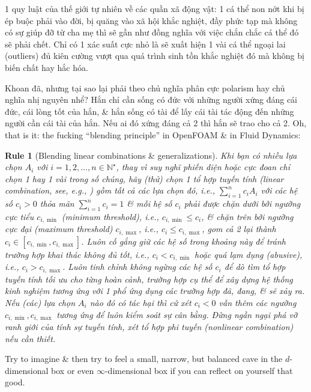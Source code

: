 \documentclass[12pt,twoside]{book}
\newtheorem{Rule}{Rule}
\begin{document}
1 quy luật của thế giới tự nhiên về các quần xã động vật: 1 cá thể non nớt khi bị ép buộc phải vào đời, bị quăng vào xã hội khắc nghiệt, đầy phức tạp mà không có sự giúp đỡ từ cha mẹ thì sẽ gần như đồng nghĩa với việc chắn chắc cá thể đó sẽ phải chết. Chỉ có 1 xác suất cực nhỏ là sẽ xuất hiện 1 vài cá thể ngoại lai (outliers) đủ kiên cường vượt qua quá trình sinh tồn khắc nghiệt đó mà không bị biến chất hay hắc hóa.

Khoan đã, nhưng tại sao lại phải theo chủ nghĩa phân cực polarism hay chủ nghĩa nhị nguyên nhể? Hắn chỉ cần sống có đức với những người xứng đáng cái đức, cái lòng tốt của hắn, \& hắn sống có tài để lấy cái tài tác động đến những người cần cái tài của hắn. Nếu ai đó xứng đáng cả 2 thì hắn sẽ trao cho cả 2. Oh, that is it: the fucking ``blending principle'' in OpenFOAM \& in Fluid Dynamics:

\begin{Rule}[Blending linear combinations \& generalizations]
	Khi bạn có nhiều lựa chọn $A_i$ với $i = 1,2,\ldots,n\in\mathbb{N}^\star$, thay vì suy nghĩ phiến diện hoặc cực đoan chỉ chọn 1 hay 1 vài trong số chúng, hãy (thử) chọn 1 tổ hợp tuyến tính (linear combination, see, e.g., {\rm\cite{Hung_linear_algebra,Trefethen_Bau1997,Trefethen_Bau2022}}) gồm tất cả các lựa chọn đó, i.e., $\sum_{i = 1}^n c_iA_i$ với các hệ số $c_i > 0$ thỏa mãn $\sum_{i = 1}^n c_i = 1$ \& mỗi hệ số $c_i$ phải được chặn dưới bởi ngưỡng cực tiểu $c_{i,\min}$ (minimum threshold), i.e., $c_{i,\min}\le c_i$, \& chặn trên bởi ngưỡng cực đại (maximum threshold) $c_{i,\max}$, i.e., $c_i\le c_{i,\max}$, gom cả 2 lại thành $c_i\in[c_{i,\min},c_{i,\max}]$. Luôn cố gắng giữ các hệ số trong khoảng này để tránh trường hợp khai thác không đủ tốt, i.e., $c_i < c_{i,\min}$ hoặc quá lạm dụng (abusive), i.e., $c_i > c_{i,\max}$. Luôn tinh chỉnh không ngừng các hệ số $c_i$ để dò tìm tổ hợp tuyến tính tối ưu cho từng hoàn cảnh, trường hợp cụ thể để xây dựng hệ thống kinh nghiệm tương ứng với 1 phổ ứng dụng các trường hợp đã, đang, \& sẽ xảy ra. Nếu (các) lựa chọn $A_i$ nào đó có tác hại thì cứ xét $c_i < 0$ vẫn thêm các ngưỡng $c_{i,\min},c_{i,\max}$ tương ứng để luôn kiểm soát sự cân bằng. Đừng ngần ngại phá vỡ ranh giới của tính sự tuyến tính, xét tổ hợp phi tuyến (nonlinear combination) nếu cần thiết.
\end{Rule}
Try to imagine \& then try to feel a small, narrow, but balanced cave in the $d$-dimensional box or even $\infty$-dimensional box if you can reflect on yourself that good.
\end{document}
